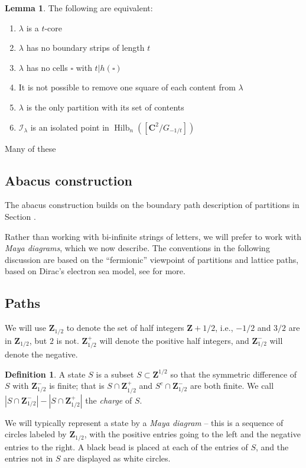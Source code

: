 \documentclass{amsart}[12pt]
\theoremstyle{definition}
\newtheorem{lemma}[dummy]{Lemma}
\newtheorem{definition}[dummy]{Definition}
\newcommand{\Z}{\mathbf{Z}}
\newcommand{\C}{\mathbf{C}}
\DeclareMathOperator{\Hilb}{Hilb}
\begin{document}
\begin{lemma}
The following are equivalent:
\begin{enumerate}
\item $\lambda$ is a $t$-core
\item $\lambda$ has no boundary strips of length $t$
\item $\lambda$ has no cells $\square$ with $t|h(\square)$
\item It is not possible to remove one square of each content from $\lambda$
\item $\lambda$ is the only partition with its set of contents
\item $\mathcal{I}_\lambda$ is an isolated point in $\Hilb_n([\C^2/G_{-1/t}])$
\end{enumerate}


\end{lemma}


Many of these

\subsection{Abacus construction}

The abacus construction builds on the boundary path description of partitions in Section .

Rather than working with bi-infinite strings of letters, we will prefer to work with \emph{Maya diagrams}, which we now describe.  The conventions in the following discussion are based on the ``fermionic'' viewpoint of partitions and lattice paths, based on Dirac's electron sea model, see \cite{KR} for more. 


\subsection{Paths}

We will use $\Z_{1/2}$ to denote the set of half integers $\Z+1/2$, i.e., $-1/2$ and $3/2$ are in $\Z_{1/2}$, but $2$ is not.  $\Z_{1/2}^+$ will denote the positive half integers, and $\Z_{1/2}^-$ will denote the negative.



\begin{definition}
A state $S$ is a subset $S\subset \Z^{1/2}$ so that the symmetric difference of $S$ with $\Z^-_{1/2}$ is finite; that is $S\cap\Z^+_{1/2}$ and $S^c\cap \Z^-_{1/2}$ are both finite.  We call $|S\cap \Z^-_{1/2}|-|S\cap \Z^+_{1/2}|$ the \emph{charge} of $S$.

We will typically represent a state by a \emph{Maya diagram} -- this is a sequence of circles labeled by $\Z_{1/2}$, with the positive entries going to the left and the negative entries to the right.  A black bead is placed at each of the entries of $S$, and the entries not in $S$ are displayed as white circles.
\end{definition}
\end{document}
